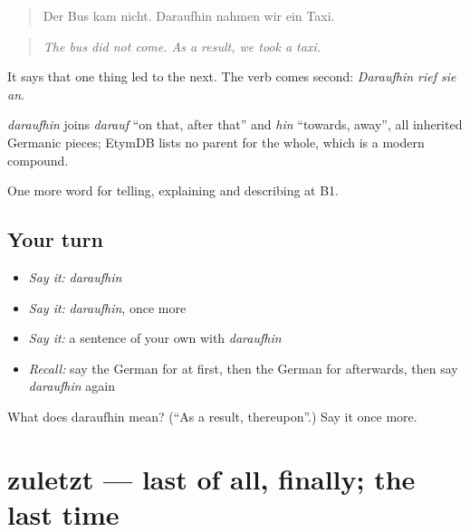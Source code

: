 \begin{quote}
Der Bus kam nicht. Daraufhin nahmen wir ein Taxi.
\end{quote}

\begin{quote}
\emph{The bus did not come. As a result, we took a taxi.}
\end{quote}

It says that one thing led to the next. The verb comes second: \emph{Daraufhin rief sie an}.

\begin{cousinweb}
\emph{daraufhin} joins \emph{darauf} \textquotedblleft{}on that, after that\textquotedblright{} and \emph{hin} \textquotedblleft{}towards, away\textquotedblright{}, all inherited Germanic pieces; EtymDB lists no parent for the whole, which is a modern compound.
\end{cousinweb}

\begin{grammarlens}[title={What you've built}]
One more word for telling, explaining and describing at B1.
\end{grammarlens}

\subsection*{Your turn}
\begin{itemize}
\raggedright
  \item \emph{Say it:} \emph{daraufhin}
  \item \emph{Say it:} \emph{daraufhin}, once more
  \item \emph{Say it:} a sentence of your own with \emph{daraufhin}
  \item \emph{Recall:} say the German for at first, then the German for afterwards, then say \emph{daraufhin} again
\end{itemize}

\begin{tcolorbox}[breakable,colback=teal!4,colframe=teal!35!black,title={Before you move on}]
What does daraufhin mean? (\textquotedblleft{}As a result, thereupon\textquotedblright{}.) Say it once more.
\end{tcolorbox}
\section[zuletzt]{zuletzt — last of all, finally; the last time}

\label{lesson:GE-C262-zuletzt}



